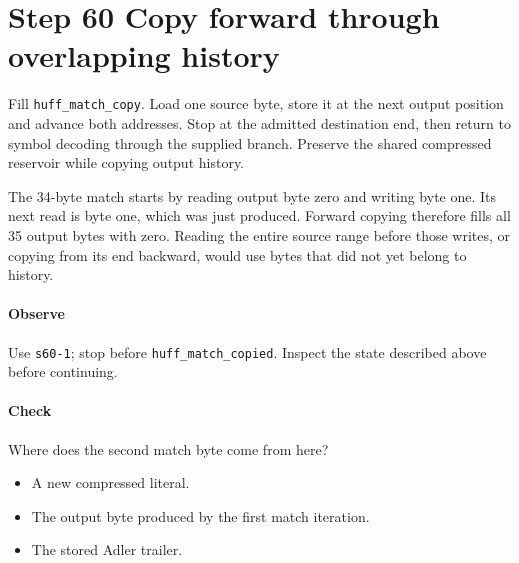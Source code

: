 \section{Step 60 Copy forward through overlapping history}\label{png-huff-s60}
Fill \texttt{huff\_match\_copy}. Load one source byte, store it at the next output position and advance both addresses. Stop at the admitted destination end, then return to symbol decoding through the supplied branch. Preserve the shared compressed reservoir while copying output history.

The 34-byte match starts by reading output byte zero and writing byte one. Its next read is byte one, which was just produced. Forward copying therefore fills all 35 output bytes with zero. Reading the entire source range before those writes, or copying from its end backward, would use bytes that did not yet belong to history.

\paragraph{Observe} Use \texttt{s60-1}; stop before \texttt{huff\_match\_copied}. Inspect the state described above before continuing.

\paragraph{Check} Where does the second match byte come from here?
\begin{itemize}
  \item[A.] A new compressed literal.
  \item[B.] The output byte produced by the first match iteration.
  \item[C.] The stored Adler trailer.
\end{itemize}
